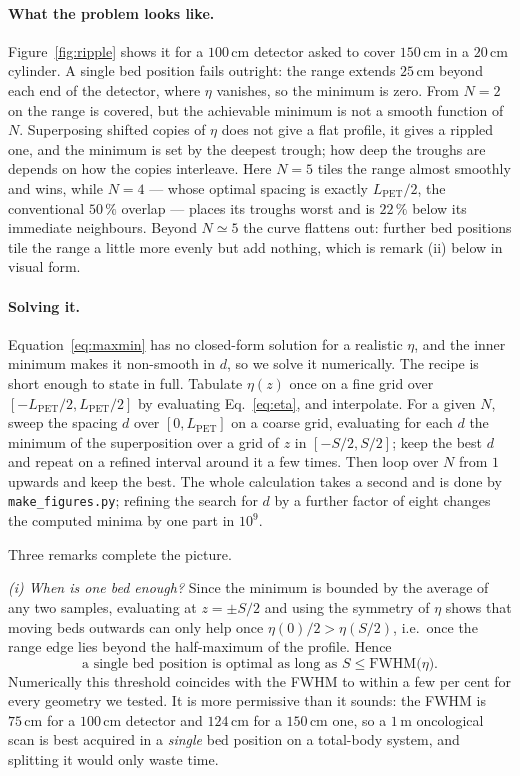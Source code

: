 \documentclass[11pt,a4paper]{article}
\newcommand{\Lpet}{L_{\mathrm{PET}}}
\begin{document}
\paragraph{What the problem looks like.}
Figure~\ref{fig:ripple} shows it for a $100\,\mathrm{cm}$ detector asked to cover
$150\,\mathrm{cm}$ in a $20\,\mathrm{cm}$ cylinder. A single bed position fails outright:
the range extends $25\,\mathrm{cm}$ beyond each end of the detector, where $\eta$ vanishes,
so the minimum is zero. From $N=2$ on the range is covered, but the achievable minimum is
not a smooth function of $N$. Superposing shifted copies of $\eta$ does not give a flat
profile, it gives a rippled one, and the minimum is set by the deepest trough; how deep the
troughs are depends on how the copies interleave. Here $N=5$ tiles the range almost
smoothly and wins, while $N=4$ --- whose optimal spacing is exactly $\Lpet/2$, the
conventional $50\,\%$ overlap --- places its troughs worst and is $22\,\%$ below its
immediate neighbours. Beyond $N\simeq5$ the curve flattens out: further bed positions tile
the range a little more evenly but add nothing, which is remark (ii) below in visual form.

\paragraph{Solving it.}
Equation~\eqref{eq:maxmin} has no closed-form solution for a realistic $\eta$, and the inner
minimum makes it non-smooth in $d$, so we solve it numerically. The recipe is short enough
to state in full. Tabulate $\eta(z)$ once on a fine grid over $[-\Lpet/2,\Lpet/2]$ by
evaluating Eq.~\eqref{eq:eta}, and interpolate. For a given $N$, sweep the spacing $d$ over
$[0,\Lpet]$ on a coarse grid, evaluating for each $d$ the minimum of the superposition over
a grid of $z$ in $[-S/2,S/2]$; keep the best $d$ and repeat on a refined interval around it
a few times. Then loop over $N$ from $1$ upwards and keep the best. The whole calculation
takes a second and is done by \texttt{make\_figures.py}; refining the search for $d$ by a
further factor of eight changes the computed minima by one part in $10^{9}$.

Three remarks complete the picture.

\emph{(i) When is one bed enough?} Since the minimum is bounded by the average of any two
samples, evaluating at $z=\pm S/2$ and using the symmetry of $\eta$ shows that moving beds
outwards can only help once $\eta(0)/2>\eta(S/2)$, i.e.\ once the range edge lies beyond the
half-maximum of the profile. Hence
\begin{equation}
  \boxed{\;\text{a single bed position is optimal as long as } S\le\mathrm{FWHM}\big(\eta\big).\;}
  \label{eq:fwhmrule}
\end{equation}
Numerically this threshold coincides with the FWHM to within a few per cent for every
geometry we tested. It is more permissive than it sounds: the FWHM is $75\,\mathrm{cm}$ for
a $100\,\mathrm{cm}$ detector and $124\,\mathrm{cm}$ for a $150\,\mathrm{cm}$ one, so a
$1\,\mathrm{m}$ oncological scan is best acquired in a \emph{single} bed position on a
total-body system, and splitting it would only waste time.
\end{document}
